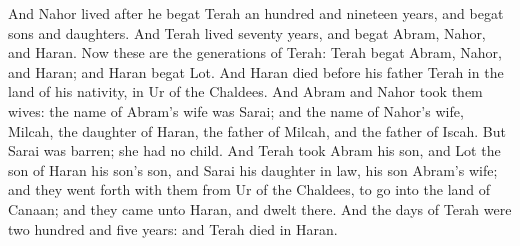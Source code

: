 \begin{biblechapter}
\verse And Nahor lived after he begat Terah an hundred and nineteen years, and begat sons and daughters.
\verse And Terah lived seventy years, and begat Abram, Nahor, and Haran.
 Now these are the generations of Terah: Terah begat Abram, Nahor, and Haran; and Haran begat Lot.
\verse And Haran died before his father Terah in the land of his nativity, in Ur of the Chaldees.
\verse And Abram and Nahor took them wives: the name of Abram's wife was Sarai; and the name of Nahor's wife, Milcah, the daughter of Haran, the father of Milcah, and the father of Iscah.
\verse But Sarai was barren; she had no child.
\verse And Terah took Abram his son, and Lot the son of Haran his son's son, and Sarai his daughter in law, his son Abram's wife; and they went forth with them from Ur of the Chaldees, to go into the land of Canaan; and they came unto Haran, and dwelt there.
\verse And the days of Terah were two hundred and five years: and Terah died in Haran.
\end{biblechapter}

